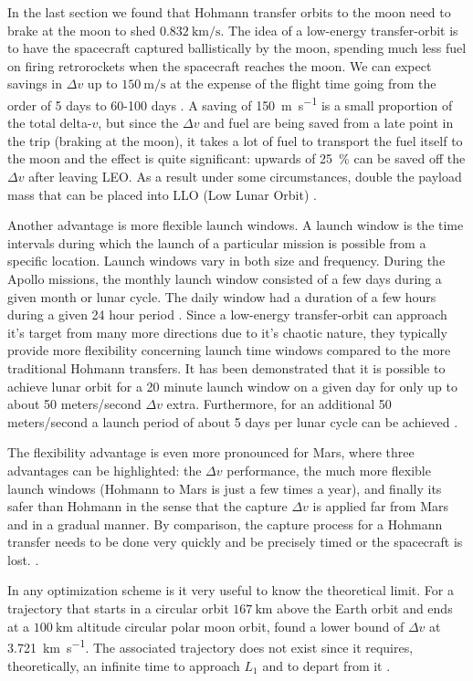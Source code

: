 In the last section we found that Hohmann transfer orbits to the moon need to brake at the moon to shed $\SI{0.832}{\km\per\s}$. The idea of a low-energy transfer-orbit is to have the spacecraft captured ballistically by the moon, spending much less fuel on firing retrorockets when the spacecraft reaches the moon. We can expect savings in $\Delta v$ up to $\SI{150}{\m\per\s}$ at the expense of the flight time going from the order of 5 days to 60-100 days \cite{Garcia2007}. A saving of \SI{150}{\m\per\s} is a small proportion of the total delta-$v$, but since the $\Delta v$ and fuel are being saved from a late point in the trip (braking at the moon), it takes a lot of fuel to transport the fuel itself to the moon and the effect is quite significant: upwards of \SI{25}{\percent} can be saved off the $\Delta v$ after leaving LEO. As a result under some circumstances, double the payload mass that can be placed into LLO (Low Lunar Orbit) \cite{Belbruno2000}.

Another advantage is more flexible launch windows. A launch window is the time intervals during which the launch of a particular mission is possible from a specific location. Launch windows vary in both size and frequency. During the Apollo missions, the monthly launch window consisted of a few days during a given month or lunar cycle. The daily window had a duration of a few hours during a given 24 hour period \cite{nasa-apollo-launch-window}. Since a low-energy transfer-orbit can approach it's target from many more directions due to it's chaotic nature, they typically provide more flexibility concerning launch time windows compared to the more traditional Hohmann transfers. It has been demonstrated that it is possible to achieve lunar orbit for a 20 minute launch window on a given day for only up to about 50 meters/second $\Delta v$ extra. Furthermore, for an additional 50 meters/second a launch period of about 5 days per lunar cycle can be achieved \cite{Belbruno2000}.

The flexibility advantage is even more pronounced for Mars, where three advantages can be highlighted: the $\Delta v$ performance, the much more flexible launch windows (Hohmann to Mars is just a few times a year), and finally its safer than Hohmann in the sense that the capture $\Delta v$ is applied far from Mars and in a gradual manner.  By comparison, the capture process for a Hohmann transfer needs to be done very quickly and be precisely timed or the spacecraft is lost. \cite{Topputo2014}.

In any optimization scheme is it very useful to know the theoretical limit. For a trajectory that starts in a circular orbit $\SI{167}{\km}$ above the Earth orbit and ends at a $\SI{100}{\km}$ altitude circular polar moon orbit, \cite{Sweetser1991} found a lower bound of $\Delta v$ at \SI{3.721}{\km\per\s}. The associated trajectory does not exist since it requires, theoretically, an infinite time to approach $L_1$ and to depart from it \cite{Topputo2005}.

